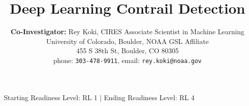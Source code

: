 \documentclass[12pt,onecolumn,letterpaper]{article}
\title{Deep Learning Contrail Detection}
\author{\normalsize \textbf{Co-Investigator:} Rey Koki, CIRES Associate Scientist in Machine Learning\\
\normalsize University of Colorado, Boulder, NOAA GSL Affiliate\\
\normalsize 455 S 38th St, Boulder, CO 80305\\
\normalsize phone: {\tt\normalsize 303-478-9911}, email: {\tt\normalsize rey.koki@noaa.gov}
}
\begin{document}
\maketitle







\begin{center}
Starting Readiness Level: RL 1 \hspace{1cm} $|$ \hspace{1cm} Ending Readiness Level: RL 4
\end{center}

\pagebreak
%


{
    \normalsize
    
%    
    
}
\end{document}
